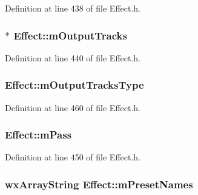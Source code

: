 Definition at line 438 of file Effect.\+h.

\subsubsection[{\texorpdfstring{m\+Output\+Tracks}{mOutputTracks}}]{$\ast$ Effect\+::m\+Output\+Tracks\hspace{0.3cm}{\ttfamily [protected]}}\hypertarget{class_effect_a9fc18f5889f07570bf0f5dff7bb0f625}{}\label{class_effect_a9fc18f5889f07570bf0f5dff7bb0f625}


Definition at line 440 of file Effect.\+h.

\subsubsection[{\texorpdfstring{m\+Output\+Tracks\+Type}{mOutputTracksType}}]{ Effect\+::m\+Output\+Tracks\+Type\hspace{0.3cm}{\ttfamily [protected]}}\hypertarget{class_effect_ab4b3ef0361e9f85c2f639bbaec2c2167}{}\label{class_effect_ab4b3ef0361e9f85c2f639bbaec2c2167}


Definition at line 460 of file Effect.\+h.

\subsubsection[{\texorpdfstring{m\+Pass}{mPass}}]{ Effect\+::m\+Pass\hspace{0.3cm}{\ttfamily [protected]}}\hypertarget{class_effect_af4b9cffdde5683dc7736eef6501822ee}{}\label{class_effect_af4b9cffdde5683dc7736eef6501822ee}


Definition at line 450 of file Effect.\+h.

\subsubsection[{\texorpdfstring{m\+Preset\+Names}{mPresetNames}}]{\setlength{\rightskip}{0pt plus 5cm}wx\+Array\+String Effect\+::m\+Preset\+Names\hspace{0.3cm}{\ttfamily [protected]}}\hypertarget{class_effect_a0524753a0b166a54fad827989686a57a}{}\label{class_effect_a0524753a0b166a54fad827989686a57a}


